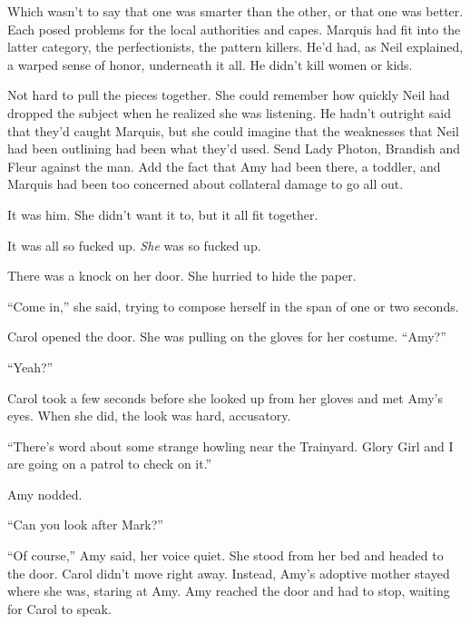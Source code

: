 Which wasn't to say that one was smarter than the other, or that one was better.  Each posed problems for the local authorities and capes.  Marquis had fit into the latter category, the perfectionists, the pattern killers.  He'd had, as Neil explained, a warped sense of honor, underneath it all.  He didn't kill women or kids.



Not hard to pull the pieces together.  She could remember how quickly Neil had dropped the subject when he realized she was listening.  He hadn't outright said that they'd caught Marquis, but she could imagine that the weaknesses that Neil had been outlining had been what they'd used.  Send Lady Photon, Brandish and Fleur against the man.  Add the fact that Amy had been there, a toddler, and Marquis had been too concerned about collateral damage to go all out.



It was him.  She didn't want it to, but it all fit together.



It was all so fucked up.  \emph{She} was so fucked up.



There was a knock on her door.  She hurried to hide the paper.



``Come in,'' she said, trying to compose herself in the span of one or two seconds.



Carol opened the door.  She was pulling on the gloves for her costume.  ``Amy?''



``Yeah?''



Carol took a few seconds before she looked up from her gloves and met Amy's eyes.  When she did, the look was hard, accusatory.



``There's word about some strange howling near the Trainyard.  Glory Girl and I are going on a patrol to check on it.''



Amy nodded.



``Can you look after Mark?''



``Of course,'' Amy said, her voice quiet.  She stood from her bed and headed to the door.  Carol didn't move right away.  Instead, Amy's adoptive mother stayed where she was, staring at Amy.  Amy reached the door and had to stop, waiting for Carol to speak.



